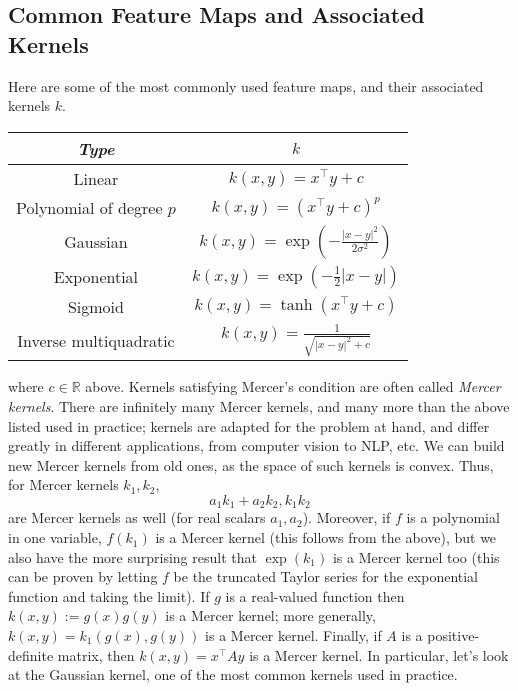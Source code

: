 \subsection{Common Feature Maps and Associated Kernels}
Here are some of the most commonly used feature maps, and their associated kernels $ k $.
\newline
\begin{center}
    \begin{tabular}{c | c}
        \textit{Type} & $ k $ \\
        \hline
        Linear & $ k(x, y) = x^\intercal y + c $ \\
        Polynomial of degree $ p $ & $ k(x, y) = (x^\intercal y + c)^p $ \\
        Gaussian & $ k(x, y) = \exp \left(- \frac{| x - y |^2}{2 \sigma^2} \right) $ \\
        Exponential & $ k(x, y) = \exp(- \frac{1}{2} | x - y |) $ \\
        Sigmoid & $ k(x, y) = \tanh(x^\intercal y + c) $ \\
        Inverse multiquadratic & $ k(x, y) = \frac{1}{\sqrt{| x - y |^2 + c}} $
    \end{tabular}
\end{center}
where $ c \in \mathbb{R} $ above. Kernels satisfying Mercer's condition are often called \textit{Mercer kernels}. There are infinitely many Mercer kernels, and many more than the above listed used in practice; kernels are adapted for the problem at hand, and differ greatly in different applications, from computer vision to NLP, etc. We can build new Mercer kernels from old ones, as the space of such kernels is convex. Thus, for Mercer kernels $ k_1, k_2 $,
$$ a_1 k_1 + a_2 k_2, k_1 k_2 $$
are Mercer kernels as well (for real scalars $ a_1, a_2 $). Moreover, if $ f $ is a polynomial in one variable, $ f(k_1) $ is a Mercer kernel (this follows from the above), but we also have the more surprising result that $ \exp(k_1) $ is a Mercer kernel too (this can be proven by letting $ f $ be the truncated Taylor series for the exponential function and taking the limit). If $ g $ is a real-valued function then $ k(x, y) := g(x) g(y) $ is a Mercer kernel; more generally, $ k(x, y) = k_1(g(x), g(y)) $ is a Mercer kernel. Finally, if $ A $ is a positive-definite matrix, then $ k(x, y) = x^\intercal A y $ is a Mercer kernel.
\newline
In particular, let's look at the Gaussian kernel, one of the most common kernels used in practice.
\newline \newline
